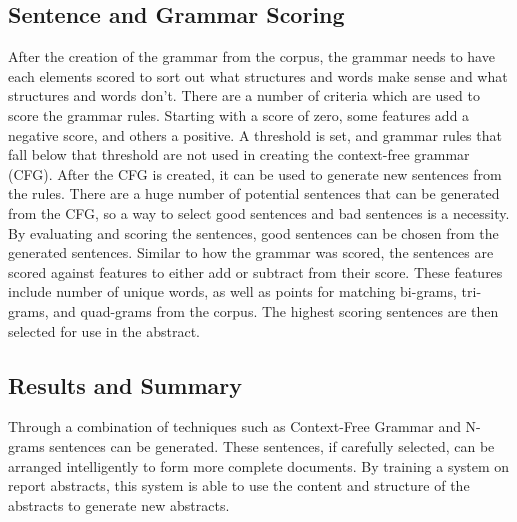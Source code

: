 \documentclass[letterpaper, 10 pt, conference]{ieeeconf}  %
\begin{document}
\subsection{Sentence and Grammar Scoring}

After the creation of the grammar from the corpus, the grammar needs to have each elements scored to sort out what structures and words make sense and what structures and words don’t. There are a number of criteria which are used to score the grammar rules. Starting with a score of zero, some features add a negative score, and others a positive. A threshold is set, and grammar rules that fall below that threshold are not used in creating the context-free grammar (CFG). 
After the CFG is created, it can be used to generate new sentences from the rules. There are a huge number of potential sentences that can be generated from the CFG, so a way to select good sentences and bad sentences is a necessity. By evaluating and scoring the sentences, good sentences can be chosen from the generated sentences. Similar to how the grammar was scored, the sentences are scored against features to either add or subtract from their score. These features include number of unique words, as well as points for matching bi-grams, tri-grams, and quad-grams from the corpus. The highest scoring sentences are then selected for use in the abstract.

\subsection{Results and Summary}

Through a combination of techniques such as Context-Free Grammar and N-grams sentences can be generated. These sentences, if carefully selected, can be arranged intelligently to form more complete documents. By training a system on report abstracts, this system is able to use the content and structure of the abstracts to generate new abstracts. 


\addtolength{\textheight}{-12cm}   %
\end{document}
